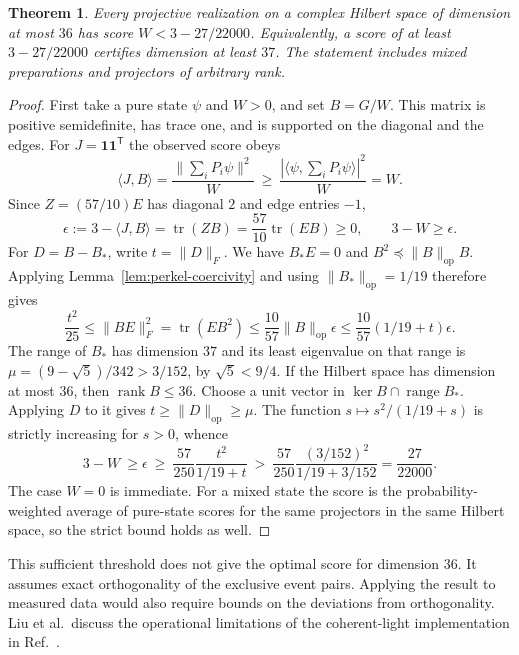 \documentclass[11pt]{article}
\newtheorem{theorem}{Theorem}
\newcommand{\one}{\mathbf 1}
\newcommand{\tr}{\operatorname{tr}}
\newcommand{\rank}{\operatorname{rank}}
\begin{document}
\begin{theorem}\label{th:perkel-spectral-witness}
Every projective realization on a complex Hilbert space of dimension at
most $36$ has score $W<3-27/22000$. Equivalently, a score of at least $3-27/22000$ certifies dimension at least $37$. The statement includes mixed preparations and
projectors of arbitrary rank.
\end{theorem}
\begin{proof}
First take a pure state $\psi$ and $W>0$, and set $B=G/W$. This matrix
is positive semidefinite, has trace one, and is supported on the diagonal
and the edges. For $J=\one\one^{\mathsf T}$ the observed score obeys
\[
  \langle J,B\rangle
  =\frac{\|\sum_iP_i\psi\|^2}{W}
  \ \geq\ \frac{|\langle\psi,\sum_iP_i\psi\rangle|^2}{W}=W.
\]
Since $Z=(57/10)E$ has diagonal $2$ and edge entries $-1$,
\[
 \epsilon:=3-\langle J,B\rangle
      =\tr(ZB)=\frac{57}{10}\tr(EB)\geq0,\qquad 3-W\geq\epsilon.
\]
For $D=B-B_*$, write $t=\|D\|_F$. We have $B_*E=0$ and
$B^2\preceq\|B\|_{\mathrm{op}}B$. Applying
Lemma~\ref{lem:perkel-coercivity} and using $\|B_*\|_{\mathrm{op}}=1/19$
therefore gives
\[
 \frac{t^2}{25}\leq\|BE\|_F^2=\tr(EB^2)
    \leq\frac{10}{57}\|B\|_{\mathrm{op}}\epsilon
    \leq\frac{10}{57}(1/19+t)\epsilon .
\]
The range of $B_*$ has dimension $37$ and its least eigenvalue on that
range is $\mu=(9-\sqrt5)/342>3/152$, by $\sqrt5<9/4$.
If the Hilbert space has dimension at most $36$, then $\rank B\leq36$.
Choose a unit vector in $\ker B\cap\operatorname{range}B_*$. Applying
$D$ to it gives $t\geq\|D\|_{\mathrm{op}}\geq\mu$.
The function $s\mapsto s^2/(1/19+s)$ is strictly increasing for $s>0$,
whence
\[
  3-W\ \geq\epsilon\ \geq\
  \frac{57}{250}\frac{t^2}{1/19+t}
  \ >\ \frac{57}{250}\frac{(3/152)^2}{1/19+3/152}
  =\frac{27}{22000}.
\]
The case $W=0$ is immediate. For a mixed state the score is the
probability-weighted average of pure-state scores for the same projectors
in the same Hilbert space, so the strict bound holds as well.
\end{proof}

This sufficient threshold does not give the optimal score for dimension 36. It assumes exact orthogonality of the exclusive event pairs. Applying the result to measured data would also require bounds on the deviations from orthogonality. Liu et al.\ discuss the operational limitations of the coherent-light implementation in Ref.~\cite{liu}.
\end{document}
